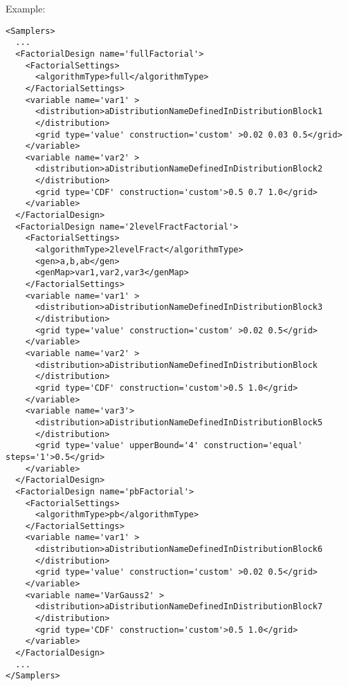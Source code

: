 Example:
\begin{lstlisting}[style=XML,morekeywords={construction,upperBound,steps}]
<Samplers>
  ...
  <FactorialDesign name='fullFactorial'>
    <FactorialSettings>
      <algorithmType>full</algorithmType>
    </FactorialSettings>
    <variable name='var1' >
      <distribution>aDistributionNameDefinedInDistributionBlock1
      </distribution>
      <grid type='value' construction='custom' >0.02 0.03 0.5</grid>
    </variable>
    <variable name='var2' >
      <distribution>aDistributionNameDefinedInDistributionBlock2
      </distribution>
      <grid type='CDF' construction='custom'>0.5 0.7 1.0</grid>
    </variable>
  </FactorialDesign>
  <FactorialDesign name='2levelFractFactorial'>
    <FactorialSettings>
      <algorithmType>2levelFract</algorithmType>
      <gen>a,b,ab</gen>
      <genMap>var1,var2,var3</genMap>
    </FactorialSettings>
    <variable name='var1' >
      <distribution>aDistributionNameDefinedInDistributionBlock3
      </distribution>
      <grid type='value' construction='custom' >0.02 0.5</grid>
    </variable>
    <variable name='var2' >
      <distribution>aDistributionNameDefinedInDistributionBlock
      </distribution>
      <grid type='CDF' construction='custom'>0.5 1.0</grid>
    </variable>
    <variable name='var3'>
      <distribution>aDistributionNameDefinedInDistributionBlock5
      </distribution>
      <grid type='value' upperBound='4' construction='equal' steps='1'>0.5</grid>
    </variable>
  </FactorialDesign>
  <FactorialDesign name='pbFactorial'>
    <FactorialSettings>
      <algorithmType>pb</algorithmType>
    </FactorialSettings>
    <variable name='var1' >
      <distribution>aDistributionNameDefinedInDistributionBlock6
      </distribution>
      <grid type='value' construction='custom' >0.02 0.5</grid>
    </variable>
    <variable name='VarGauss2' >
      <distribution>aDistributionNameDefinedInDistributionBlock7
      </distribution>
      <grid type='CDF' construction='custom'>0.5 1.0</grid>
    </variable>
  </FactorialDesign>
  ...
</Samplers>
\end{lstlisting}

